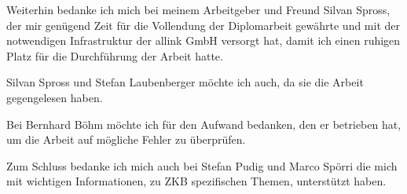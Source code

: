 Weiterhin bedanke ich mich bei meinem Arbeitgeber und Freund Silvan Spross,
der mir genügend Zeit für die Vollendung der Diplomarbeit gewährte und mit der
notwendigen Infrastruktur der allink GmbH versorgt hat, damit ich einen
ruhigen Platz für die Durchführung der Arbeit hatte.
  
Silvan Spross und Stefan Laubenberger möchte ich auch, da sie die Arbeit
gegengelesen haben.

Bei Bernhard Böhm möchte ich für den Aufwand bedanken, den er betrieben hat, um
die Arbeit auf mögliche Fehler zu überprüfen.
  
Zum Schluss bedanke ich mich auch bei Stefan Pudig und Marco Spörri die
mich mit wichtigen Informationen, zu \ac{ZKB} spezifischen Themen, unterstützt
haben.
